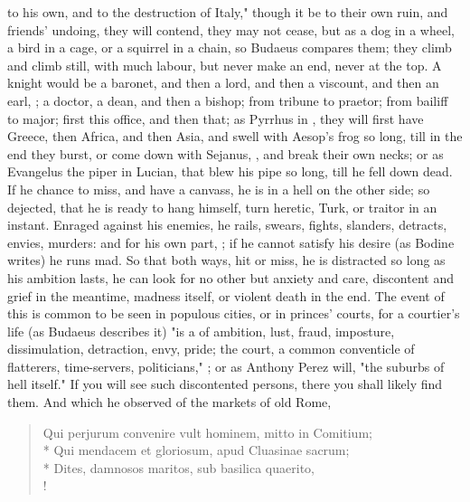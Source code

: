 to his own, and to the destruction of Italy," though it be to their own ruin,
and friends' undoing, they will contend, they may not cease, but as a dog in a
wheel, a bird in a cage, or a squirrel in a chain, so
Budaeus compares them; they climb and
climb still, with much labour, but never make an end, never at the top. A
knight would be a baronet, and then a lord, and then a viscount, and then an
earl, \etc{}; a doctor, a dean, and then a bishop; from tribune to praetor;
from bailiff to major; first this office, and then that; as Pyrrhus in
\Plutarch{}, they will first have Greece, then Africa, and
then Asia, and swell with Aesop's frog so long, till in the end they burst, or
come down with Sejanus, , and break their own necks; or
as Evangelus the piper in Lucian, that blew his pipe so long, till he fell down
dead. If he chance to miss, and have a canvass, he is in a hell on the other
side; so dejected, that he is ready to hang himself, turn heretic, Turk, or
traitor in an instant. Enraged against his enemies, he rails, swears, fights,
slanders, detracts, envies, murders: and for his own part, ; if he cannot satisfy his desire (as
Bodine writes) he runs mad. So that both ways, hit or
miss, he is distracted so long as his ambition lasts, he can look for no other
but anxiety and care, discontent and grief in the meantime,
madness itself, or violent death in the end. The event of
this is common to be seen in populous cities, or in princes' courts, for a
courtier's life (as Budaeus describes it) "is a  of ambition, lust, fraud,
imposture, dissimulation, detraction, envy, pride; the
court, a common conventicle of flatterers, time-servers, politicians," \etc{};
or as Anthony Perez will, "the suburbs of hell itself." If
you will see such discontented persons, there you shall likely find them.
And which he observed of the markets of old Rome,

\begin{latin}
\begin{verse}%
Qui perjurum convenire vult hominem, mitto in Comitium;\\*
Qui mendacem et gloriosum, apud Cluasinae sacrum;\\*
Dites, damnosos maritos, sub basilica quaerito, \etc{}\\!
\end{verse}%
\end{latin}

